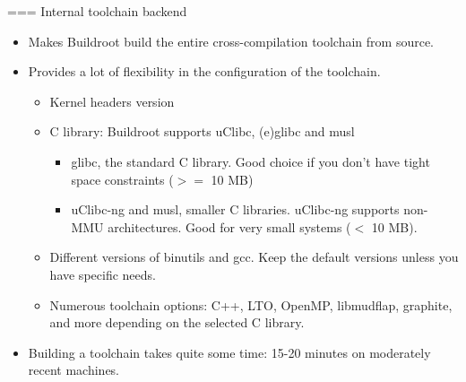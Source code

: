 === Internal toolchain backend
  \begin{itemize}
  \item Makes Buildroot build the entire cross-compilation toolchain
    from source.
  \item Provides a lot of flexibility in the configuration of the
    toolchain.
    \begin{itemize}
    \item Kernel headers version
    \item C library: Buildroot supports uClibc, (e)glibc and musl
      \begin{itemize}
      \item glibc, the standard C library. Good choice if you don't
        have tight space constraints ($>=$ 10 MB)
      \item uClibc-ng and musl, smaller C libraries. uClibc-ng supports
        non-MMU architectures. Good for very small systems ($<$ 10 MB).
      \end{itemize}
    \item Different versions of binutils and gcc. Keep the default
      versions unless you have specific needs.
    \item Numerous toolchain options: C++, LTO, OpenMP, libmudflap,
      graphite, and more depending on the selected C library.
    \end{itemize}
  \item Building a toolchain takes quite some time: 15-20 minutes on
    moderately recent machines.
  \end{itemize}


